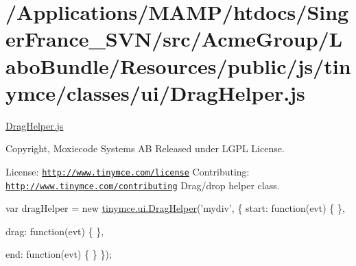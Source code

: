\hypertarget{_2_applications_2_m_a_m_p_2htdocs_2_singer_france__s_v_n_2src_2_acme_group_2_labo_bundle_2_resou5c2d190bc6e7e81f7a18c7aabc4e5b1d}{\section{/\+Applications/\+M\+A\+M\+P/htdocs/\+Singer\+France\+\_\+\+S\+V\+N/src/\+Acme\+Group/\+Labo\+Bundle/\+Resources/public/js/tinymce/classes/ui/\+Drag\+Helper.\+js}
}
\hyperlink{_drag_helper_8js}{Drag\+Helper.\+js}

Copyright, Moxiecode Systems A\+B Released under L\+G\+P\+L License.

License\+: \href{http://www.tinymce.com/license}{\tt http\+://www.\+tinymce.\+com/license} Contributing\+: \href{http://www.tinymce.com/contributing}{\tt http\+://www.\+tinymce.\+com/contributing} Drag/drop helper class.

var drag\+Helper = new \hyperlink{classtinymce_1_1ui_1_1_drag_helper}{tinymce.\+ui.\+Drag\+Helper}('mydiv', \{ start\+: function(evt) \{ \},

drag\+: function(evt) \{ \},

end\+: function(evt) \{ \} \});


\begin{DoxyCodeInclude}
\end{DoxyCodeInclude}
 